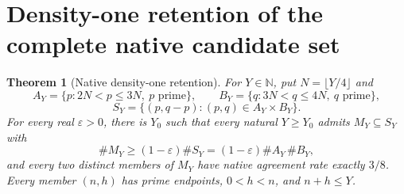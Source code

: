 \documentclass[11pt]{article}
\newtheorem{theorem}{Theorem}[section]
\begin{document}
\section{Density-one retention of the complete native candidate set}
\label{sec:native-density-one}

\begin{theorem}[Native density-one retention]
\label{thm:native-density-one}
For \(Y\in\mathbb N\), put \(N=\lfloor Y/4\rfloor\) and
\[
 A_Y=\{p:2N<p\le3N,\ p\text{ prime}\},\qquad
 B_Y=\{q:3N<q\le4N,\ q\text{ prime}\},
\]
\[
 S_Y=\{(p,q-p):(p,q)\in A_Y\times B_Y\}.
\]
For every real \(\varepsilon>0\), there is \(Y_0\) such that
every natural \(Y\ge Y_0\) admits \(M_Y\subseteq S_Y\) with
\[
 \#M_Y\ge(1-\varepsilon)\#S_Y
       =(1-\varepsilon)\#A_Y\,\#B_Y,
\]
and every two distinct members of \(M_Y\) have native agreement
rate exactly \(3/8\). Every member \((n,h)\) has prime endpoints,
\(0<h<n\), and \(n+h\le Y\).
\end{theorem}
\end{document}

